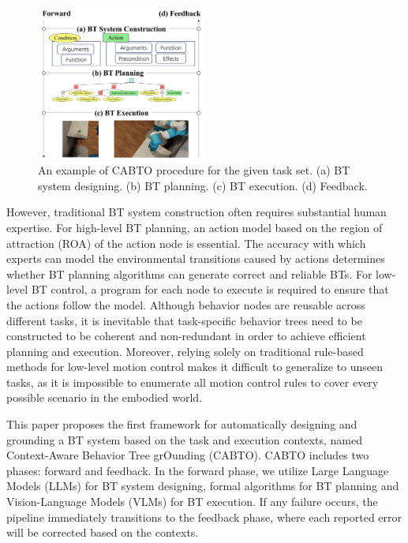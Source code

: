 \documentclass{article}
\begin{document}
\begin{figure}[t]
    \centering
    \includegraphics[width=0.5\textwidth]{figures/introduction}
    \caption{An example of CABTO procedure for the given task set. (a) BT system designing. (b) BT planning. (c) BT execution. (d) Feedback.}
    \label{fig:introduction}
\end{figure}


However, traditional BT system construction often requires substantial human expertise. For high-level BT planning, an action model based on the region of attraction (ROA) of the action node is essential. The accuracy with which experts can model the environmental transitions caused by actions determines whether BT planning algorithms can generate correct and reliable BTs. For low-level BT control, a program for each node to execute is required to ensure that the actions follow the model. Although behavior nodes are reusable across different tasks, it is inevitable that task-specific behavior trees need to be constructed to be coherent and non-redundant in order to achieve efficient planning and execution. Moreover, relying solely on traditional rule-based methods for low-level motion control makes it difficult to generalize to unseen tasks, as it is impossible to enumerate all motion control rules to cover every possible scenario in the embodied world.



This paper proposes the first framework for automatically designing and grounding a BT system based on the task and execution contexts, named Context-Aware Behavior Tree grOunding (CABTO). CABTO includes two phases: forward and feedback. In the forward phase, we utilize Large Language Models (LLMs) for BT system designing, formal algorithms for BT planning and Vision-Language Models (VLMs) for BT execution. If any failure occurs, the pipeline immediately transitions to the feedback phase, where each reported error will be corrected based on the contexts.
\end{document}
